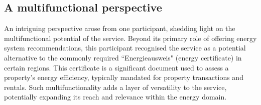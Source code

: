 \subsection{A multifunctional perspective}

An intriguing perspective arose from one participant, shedding light on the multifunctional potential of the service. 
Beyond its primary role of offering energy system recommendations, this participant recognised the service as a potential alternative to the commonly required  ``Energieausweis" (energy certificate) \cite{verbraucherzentrale} in certain regions. 
This certificate is a significant document used to assess a property's energy efficiency, typically mandated for property transactions and rentals.
Such multifunctionality adds a layer of versatility to the service, potentially expanding its reach and relevance within the energy domain.